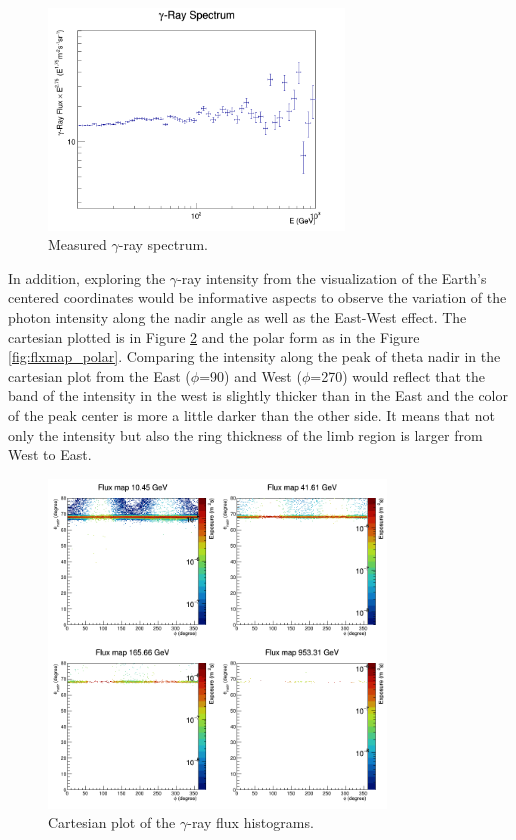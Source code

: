 \begin{figure}[h!]
    \centering
    \includegraphics[width=0.7\textwidth]{content/result_and_discussion/figures/flx_hist.png}
    \caption{Measured $\gamma$-ray spectrum.}
    \label{fig:flxhist}
\end{figure}

In addition, exploring the $\gamma$-ray
intensity from the visualization
of the Earth's centered coordinates would be informative aspects
to observe the variation of the photon
intensity along the nadir angle as well as the 
East-West effect. The cartesian plotted is in Figure
\ref{fig:flxmap_cartesian} and the polar form as in the Figure 
\ref{fig:flxmap_polar}. Comparing the intensity along the peak of 
theta nadir in the cartesian plot from the East ($\phi$=90\textdegree)
and West ($\phi$=270\textdegree) would reflect that the band of 
the intensity in the west is slightly
thicker than in the East and the 
color of the peak center is more a little darker than the other 
side. It means that not only the intensity
but also the ring thickness
of the limb region is larger from West to East.


\begin{figure}[h!]
    \centering
    \includegraphics[width=0.8\textwidth]{content/result_and_discussion/figures/cartesian_flxmaps.png}
    \caption{Cartesian plot of the $\gamma$-ray flux histograms.}
    \label{fig:flxmap_cartesian}
\end{figure}



